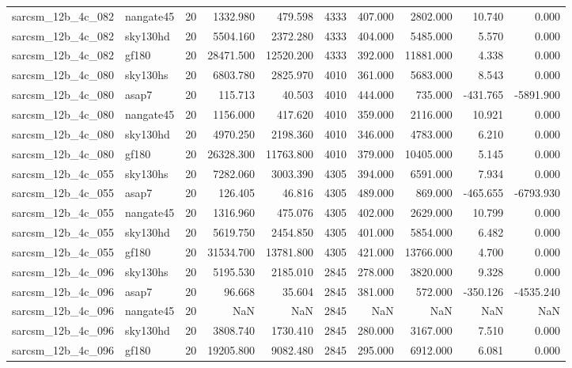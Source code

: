 \begin{tabular}{llrrrrrrrr}
sarcsm\_12b\_4c\_082 & nangate45 & 20 & 1332.980 & 479.598 & 4333 & 407.000 & 2802.000 & 10.740 & 0.000 \\
sarcsm\_12b\_4c\_082 & sky130hd & 20 & 5504.160 & 2372.280 & 4333 & 404.000 & 5485.000 & 5.570 & 0.000 \\
sarcsm\_12b\_4c\_082 & gf180 & 20 & 28471.500 & 12520.200 & 4333 & 392.000 & 11881.000 & 4.338 & 0.000 \\
sarcsm\_12b\_4c\_080 & sky130hs & 20 & 6803.780 & 2825.970 & 4010 & 361.000 & 5683.000 & 8.543 & 0.000 \\
sarcsm\_12b\_4c\_080 & asap7 & 20 & 115.713 & 40.503 & 4010 & 444.000 & 735.000 & -431.765 & -5891.900 \\
sarcsm\_12b\_4c\_080 & nangate45 & 20 & 1156.000 & 417.620 & 4010 & 359.000 & 2116.000 & 10.921 & 0.000 \\
sarcsm\_12b\_4c\_080 & sky130hd & 20 & 4970.250 & 2198.360 & 4010 & 346.000 & 4783.000 & 6.210 & 0.000 \\
sarcsm\_12b\_4c\_080 & gf180 & 20 & 26328.300 & 11763.800 & 4010 & 379.000 & 10405.000 & 5.145 & 0.000 \\
sarcsm\_12b\_4c\_055 & sky130hs & 20 & 7282.060 & 3003.390 & 4305 & 394.000 & 6591.000 & 7.934 & 0.000 \\
sarcsm\_12b\_4c\_055 & asap7 & 20 & 126.405 & 46.816 & 4305 & 489.000 & 869.000 & -465.655 & -6793.930 \\
sarcsm\_12b\_4c\_055 & nangate45 & 20 & 1316.960 & 475.076 & 4305 & 402.000 & 2629.000 & 10.799 & 0.000 \\
sarcsm\_12b\_4c\_055 & sky130hd & 20 & 5619.750 & 2454.850 & 4305 & 401.000 & 5854.000 & 6.482 & 0.000 \\
sarcsm\_12b\_4c\_055 & gf180 & 20 & 31534.700 & 13781.800 & 4305 & 421.000 & 13766.000 & 4.700 & 0.000 \\
sarcsm\_12b\_4c\_096 & sky130hs & 20 & 5195.530 & 2185.010 & 2845 & 278.000 & 3820.000 & 9.328 & 0.000 \\
sarcsm\_12b\_4c\_096 & asap7 & 20 & 96.668 & 35.604 & 2845 & 381.000 & 572.000 & -350.126 & -4535.240 \\
sarcsm\_12b\_4c\_096 & nangate45 & 20 & NaN & NaN & 2845 & NaN & NaN & NaN & NaN \\
sarcsm\_12b\_4c\_096 & sky130hd & 20 & 3808.740 & 1730.410 & 2845 & 280.000 & 3167.000 & 7.510 & 0.000 \\
sarcsm\_12b\_4c\_096 & gf180 & 20 & 19205.800 & 9082.480 & 2845 & 295.000 & 6912.000 & 6.081 & 0.000 \\

\end{tabular}
